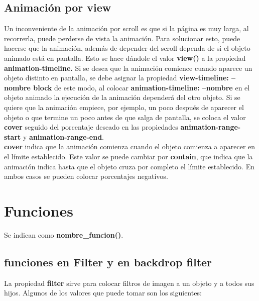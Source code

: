\documentclass[10pt,oneside]{article}
\begin{document}
\begin{multicols}{2}
\subsection{Animación por view}

    Un inconveniente de la animación por scroll es que si la página es muy larga, al recorrerla, puede perderse de vista la animación. Para solucionar esto, puede hacerse que la animación, además de depender del scroll dependa de si el objeto animado está en pantalla. Esto se hace dándole el valor \textbf{view()} a la propiedad \textbf{animation-timeline.} Si se desea que la animación comience cuando aparece un objeto distinto en pantalla, se debe asignar la propiedad \textbf{view-timeline: --nombre block} de este modo, al colocar \textbf{animation-timeline: --nombre} en el objeto animado la ejecución de la animación dependerá del otro objeto. Si se quiere que la animación empiece, por ejemplo, un poco después de aparecer el objeto o que termine un poco antes de que salga de pantalla, se coloca el valor \textbf{cover} seguido del porcentaje deseado en las propiedades \textbf{animation-range-start} y \textbf{animation-range-end}. \\ \newline \textbf{cover} indica que la animación comienza cuando el objeto comienza a aparecer en el límite establecido. Este valor se puede cambiar por \textbf{contain}, que indica que la animación indica hasta que el objeto cruza por completo el límite establecido. En ambos casos se pueden colocar porcentajes negativos.

\section{Funciones}
    Se indican como \textbf{nombre\_funcion()}.

\subsection{funciones en Filter y en backdrop filter}
    La propiedad \textbf{filter} sirve para colocar filtros de imagen a un objeto y a todos sus hijos. Algunos de los valores que puede tomar son los siguientes: 
    

\end{multicols}
\end{document}
